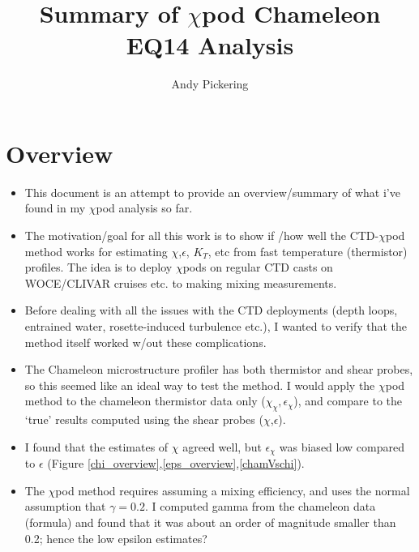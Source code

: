 \documentclass[11pt]{article}
\title{Summary of $\chi$pod Chameleon EQ14 Analysis}
\author{Andy Pickering}
\begin{document}
\maketitle

\tableofcontents
\newpage


\section{Overview}

\begin{itemize}

\item This document is an attempt to provide an overview/summary of what i've found in my $\chi$pod analysis so far. 

\item The motivation/goal for all this work is to show if /how well the CTD-$\chi$pod method works for estimating $\chi$,$\epsilon$, $K_T$, etc from fast temperature (thermistor) profiles. The idea is to deploy $\chi$pods on regular CTD casts on WOCE/CLIVAR cruises etc. to making mixing measurements.

\item Before dealing with all the issues with the CTD deployments (depth loops, entrained water, rosette-induced turbulence etc.), I wanted to verify that the method itself worked w/out these complications. 

\item The Chameleon microstructure profiler has both thermistor and shear probes, so this seemed like an ideal way to test the method. I would apply the $\chi$pod method to the chameleon thermistor data only ($\chi_{\chi},\epsilon_{\chi}$), and compare to the `true' results computed using the shear probes ($\chi$,$\epsilon$).

\item I found that the estimates of $\chi$ agreed well, but $\epsilon_{\chi}$ was biased low compared to $\epsilon$ (Figure \ref{chi_overview},\ref{eps_overview},\ref{chamVschi}).

\item The $\chi$pod method requires assuming a mixing efficiency, and uses the normal assumption that $\gamma=0.2$. I computed gamma from the chameleon data (formula) and found that it was about an order of magnitude smaller than 0.2; hence the low epsilon estimates?



\end{itemize}
\end{document}
